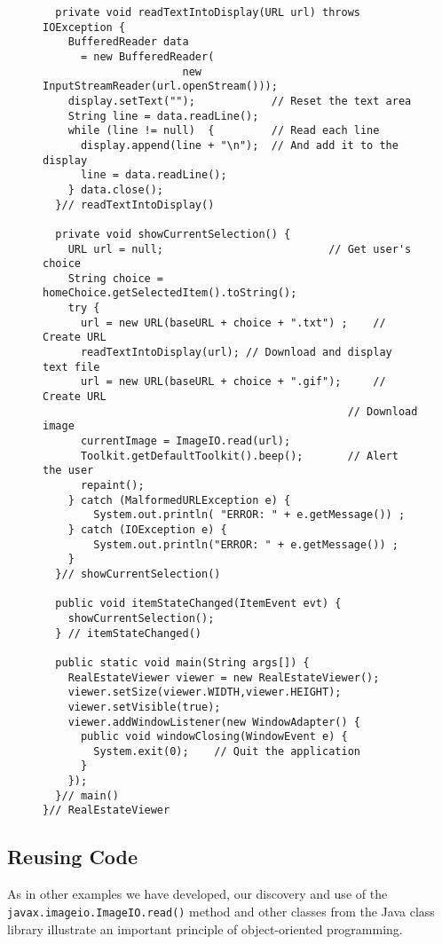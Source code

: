 \begin{figure}[p]
\addtocounter{figure}{-1}
\jjjprogstart
\begin{jjjlisting}[30pc]
\begin{lstlisting}
  private void readTextIntoDisplay(URL url) throws IOException {
    BufferedReader data
      = new BufferedReader(
                      new InputStreamReader(url.openStream()));
    display.setText("");            // Reset the text area
    String line = data.readLine();
    while (line != null)  {         // Read each line
      display.append(line + "\n");  // And add it to the display
      line = data.readLine();
    } data.close();
  }// readTextIntoDisplay()

  private void showCurrentSelection() {
    URL url = null;                          // Get user's choice
    String choice = homeChoice.getSelectedItem().toString();     
    try {
      url = new URL(baseURL + choice + ".txt") ;    // Create URL
      readTextIntoDisplay(url); // Download and display text file
      url = new URL(baseURL + choice + ".gif");     // Create URL
                                                // Download image
      currentImage = ImageIO.read(url);
      Toolkit.getDefaultToolkit().beep();       // Alert the user
      repaint();
    } catch (MalformedURLException e) {
        System.out.println( "ERROR: " + e.getMessage()) ;
    } catch (IOException e) {
        System.out.println("ERROR: " + e.getMessage()) ;
    }
  }// showCurrentSelection()

  public void itemStateChanged(ItemEvent evt) {
    showCurrentSelection();
  } // itemStateChanged()

  public static void main(String args[]) {
    RealEstateViewer viewer = new RealEstateViewer();
    viewer.setSize(viewer.WIDTH,viewer.HEIGHT);
    viewer.setVisible(true);
    viewer.addWindowListener(new WindowAdapter() {     
      public void windowClosing(WindowEvent e) {
        System.exit(0);    // Quit the application
      }
    });
  }// main()
}// RealEstateViewer
\end{lstlisting}
\end{jjjlisting}
\end{figure}

\subsection{Reusing Code}
\noindent As in other examples we have developed, our discovery and use of the
{\tt javax.imageio.ImageIO.read()} method and other classes from the Java class
library illustrate an important principle of object-oriented
programming.

